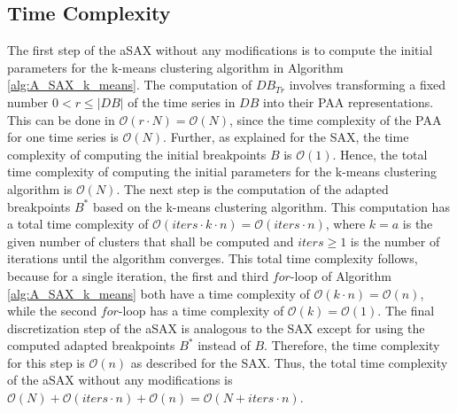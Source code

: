 \subsection*{Time Complexity}
The first step of the \ac{aSAX} without any modifications is to compute the initial parameters for the k-means clustering algorithm in Algorithm \ref{alg:A_SAX_k_means}. The computation of $DB_{Tr}$ involves transforming a fixed number $0 < r \leq |DB|$ of the time series in $DB$ into their \ac{PAA} representations. This can be done in $\mathcal{O}(r \cdot N) = \mathcal{O}(N)$, since the time complexity of the \ac{PAA} for one time series is $\mathcal{O}(N)$. Further, as explained for the \ac{SAX}, the time complexity of computing the initial breakpoints $B$ is $\mathcal{O}(1)$. Hence, the total time complexity of computing the initial parameters for the k-means clustering algorithm is $\mathcal{O}(N)$. \newline
The next step is the computation of the adapted breakpoints $B^*$ based on the k-means clustering algorithm. This computation has a total time complexity of $\mathcal{O}(iters \cdot k \cdot n) = \mathcal{O}(iters \cdot n)$, where $k = a$ is the given number of clusters that shall be computed and $iters \geq 1$ is the number of iterations until the algorithm converges. This total time complexity follows, because for a single iteration, the first and third $for$-loop of Algorithm \ref{alg:A_SAX_k_means} both have a time complexity of $\mathcal{O}(k \cdot n) = \mathcal{O}(n)$, while the second $for$-loop has a time complexity of $\mathcal{O}(k) = \mathcal{O}(1)$. \newline
The final discretization step of the \ac{aSAX} is analogous to the \ac{SAX} except for using the computed adapted breakpoints $B^*$ instead of $B$. Therefore, the time complexity for this step is $\mathcal{O}(n)$ as described for the \ac{SAX}. \newline
Thus, the total time complexity of the \ac{aSAX} without any modifications is $\mathcal{O}(N) + \mathcal{O}(iters \cdot n) + \mathcal{O}(n) = \mathcal{O}(N + iters \cdot n)$.

